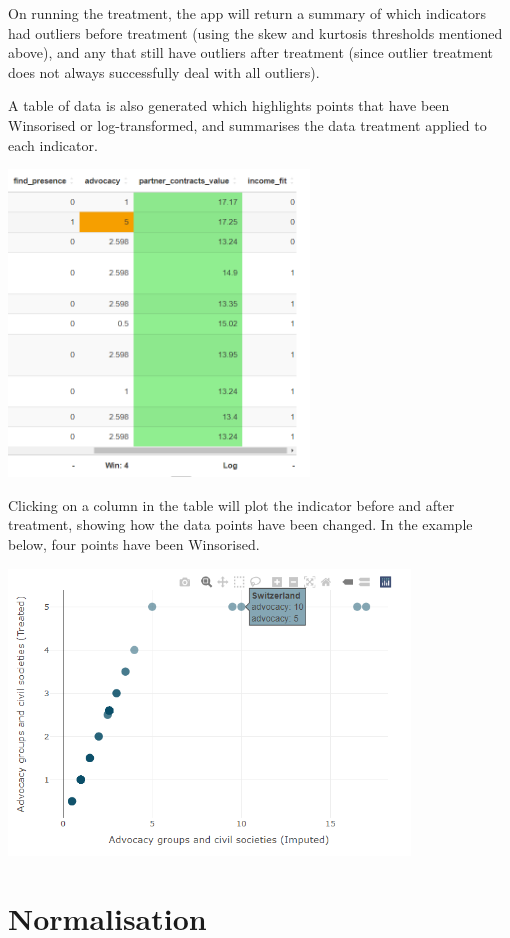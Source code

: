 \documentclass[
  letterpaper,
  DIV=11,
  numbers=noendperiod]{scrreprt}
\begin{document}
On running the treatment, the app will return a summary of which
indicators had outliers before treatment (using the skew and kurtosis
thresholds mentioned above), and any that still have outliers after
treatment (since outlier treatment does not always successfully deal
with all outliers).

A table of data is also generated which highlights points that have been
Winsorised or log-transformed, and summarises the data treatment applied
to each indicator.

\includegraphics[width=0.6\textwidth,height=\textheight]{figs/treat_2.png}

Clicking on a column in the table will plot the indicator before and
after treatment, showing how the data points have been changed. In the
example below, four points have been Winsorised.

\includegraphics[width=0.8\textwidth,height=\textheight]{figs/treat_3.png}

\hypertarget{sec-normalisation}{%
\chapter{Normalisation}\label{sec-normalisation}}
\end{document}
